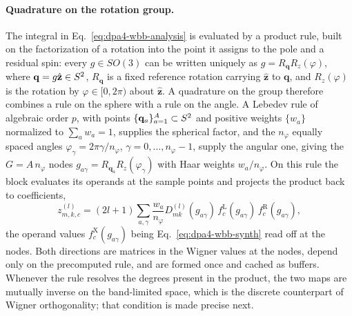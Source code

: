 \paragraph{Quadrature on the rotation group.}
The integral in Eq.~\eqref{eq:dpa4-wbb-analysis} is evaluated by a product rule, built on the factorization of a rotation into the point it assigns to the pole and a residual spin: every $g\in SO(3)$ can be written uniquely as $g=R_{\mathbf{q}}R_{z}(\varphi)$, where $\mathbf{q}=g\hat{\mathbf{z}}\in S^2$, $R_{\mathbf{q}}$ is a fixed reference rotation carrying $\hat{\mathbf{z}}$ to $\mathbf{q}$, and $R_{z}(\varphi)$ is the rotation by $\varphi\in[0,2\pi)$ about $\hat{\mathbf{z}}$.
A quadrature on the group therefore combines a rule on the sphere with a rule on the angle.
A Lebedev rule of algebraic order $p$, with points $\{\mathbf{q}_a\}_{a=1}^{A}\subset S^2$ and positive weights $\{w_a\}$ normalized to $\sum_a w_a=1$, supplies the spherical factor, and the $n_\varphi$ equally spaced angles $\varphi_\gamma=2\pi\gamma/n_\varphi$, $\gamma=0,\dots,n_\varphi-1$, supply the angular one, giving the $G=A\,n_\varphi$ nodes $g_{a\gamma}=R_{\mathbf{q}_a}R_{z}(\varphi_\gamma)$ with Haar weights $w_a/n_\varphi$.
On this rule the block evaluates its operands at the sample points and projects the product back to coefficients,
\begin{equation}
    z^{(l)}_{m,k,c}=(2l+1)\sum_{a,\gamma}\frac{w_a}{n_\varphi}
      D^{(l)}_{mk}(g_{a\gamma})\,f^{\mathrm{L}}_c(g_{a\gamma})\,f^{\mathrm{R}}_c(g_{a\gamma}),
    \label{eq:dpa4-wbb-quad}
\end{equation}
the operand values $f^{\mathrm{X}}_c(g_{a\gamma})$ being Eq.~\eqref{eq:dpa4-wbb-synth} read off at the nodes.
Both directions are matrices in the Wigner values at the nodes, depend only on the precomputed rule, and are formed once and cached as buffers.
Whenever the rule resolves the degrees present in the product, the two maps are mutually inverse on the band-limited space, which is the discrete counterpart of Wigner orthogonality; that condition is made precise next.

